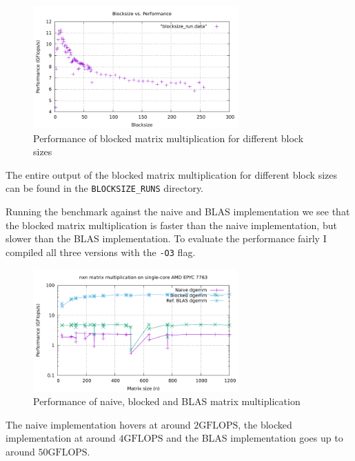 \documentclass[unicode,11pt,a4paper,oneside,numbers=endperiod,openany]{scrartcl}
\begin{document}
\begin{figure}[h]
    \centering
    \includegraphics[width=0.7\textwidth]{../01b/BLOCKSIZE_RUNS/blocksize.pdf}
    \caption{Performance of blocked matrix multiplication for different block sizes}
    \label{fig:blocked_matrix_multiplication}
\end{figure}

The entire output of the blocked matrix multiplication for different block sizes can be found in the \texttt{BLOCKSIZE\_RUNS} directory.

Running the benchmark against the naive and BLAS implementation we see that the blocked matrix multiplication is faster than the naive implementation, but slower than the BLAS implementation. To evaluate the performance fairly I compiled all three versions with the \texttt{-O3} flag.

\begin{figure}[h]
    \centering
    \includegraphics[width=0.7\textwidth]{../01b/EPYC_7763_GCC/timing.pdf}
    \caption{Performance of naive, blocked and BLAS matrix multiplication}
    \label{fig:naive_vs_blocked_vs_blas}
\end{figure}

The naive implementation hovers at around $2\text{GFLOPS}$, the blocked implementation at around $4\text{GFLOPS}$ and the BLAS implementation goes up to around $50\text{GFLOPS}$.
\end{document}
